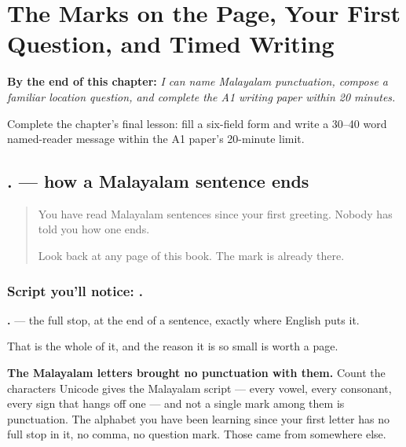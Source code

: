 
\chapter{The Marks on the Page, Your First Question, and Timed Writing}
\label{ch:ml-marks}

\begin{chapteropening}
\textbf{By the end of this chapter:} \emph{I can name Malayalam punctuation, compose a familiar location question, and complete the A1 writing paper within 20 minutes.}

Complete the chapter's final lesson: fill a six-field form and write a 30–40 word named-reader message within the A1 paper's 20-minute limit.
\end{chapteropening}

\section[. (full stop)]{. — how a Malayalam sentence ends}

\label{lesson:ML-W108-full-stop}



\begin{quote}
You have read Malayalam sentences since your first greeting. Nobody has told you how one ends.

Look back at any page of this book. The mark is already there.
\end{quote}

\subsection*{Script you'll notice: .}
\textbf{.} — the full stop, at the end of a sentence, exactly where English puts it.

That is the whole of it, and the reason it is so small is worth a page.

\textbf{The Malayalam letters brought no punctuation with them.} Count the characters Unicode gives the Malayalam script — every vowel, every consonant, every sign that hangs off one — and not a single mark among them is punctuation. The alphabet you have been learning since your first letter has no full stop in it, no comma, no question mark. Those came from somewhere else.

